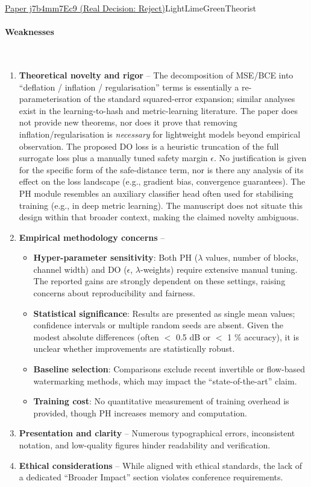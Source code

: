 \documentclass{article} %
\begin{document}
\begin{reviewbox}{\href{https://openreview.net/forum?id=j7b4mm7Ec9}{Paper j7b4mm7Ec9 (Real Decision: Reject)}}{LightLimeGreen}{Theorist}
\paragraph{Weaknesses}
\leavevmode\\[0.1em]
\begin{enumerate}[leftmargin=0.5em, itemsep=0pt, topsep=0pt]
    \item \textbf{Theoretical novelty and rigor} – The decomposition of MSE/BCE into “deflation / inflation / regularisation” terms is essentially a re-parameterisation of the standard squared-error expansion; similar analyses exist in the learning-to-hash and metric-learning literature. The paper does not provide new theorems, nor does it prove that removing inflation/regularisation is \emph{necessary} for lightweight models beyond empirical observation. The proposed DO loss is a heuristic truncation of the full surrogate loss plus a manually tuned safety margin $\epsilon$. No justification is given for the specific form of the safe-distance term, nor is there any analysis of its effect on the loss landscape (e.g., gradient bias, convergence guarantees). The PH module resembles an auxiliary classifier head often used for stabilising training (e.g., in deep metric learning). The manuscript does not situate this design within that broader context, making the claimed novelty ambiguous.
    \item \textbf{Empirical methodology concerns} –
    \begin{itemize}[leftmargin=1em, itemsep=0pt, topsep=0pt]
        \item \textbf{Hyper-parameter sensitivity}: Both PH ($\lambda$ values, number of blocks, channel width) and DO ($\epsilon$, $\lambda$-weights) require extensive manual tuning. The reported gains are strongly dependent on these settings, raising concerns about reproducibility and fairness.
        \item \textbf{Statistical significance}: Results are presented as single mean values; confidence intervals or multiple random seeds are absent. Given the modest absolute differences (often $<$ 0.5 dB or $<$ 1 \% accuracy), it is unclear whether improvements are statistically robust.
        \item \textbf{Baseline selection}: Comparisons exclude recent invertible or flow-based watermarking methods, which may impact the “state-of-the-art” claim.
        \item \textbf{Training cost}: No quantitative measurement of training overhead is provided, though PH increases memory and computation.
    \end{itemize}
    \item \textbf{Presentation and clarity} – Numerous typographical errors, inconsistent notation, and low-quality figures hinder readability and verification.
    \item \textbf{Ethical considerations} – While aligned with ethical standards, the lack of a dedicated “Broader Impact” section violates conference requirements.
\end{enumerate}


\end{reviewbox}
\end{document}
